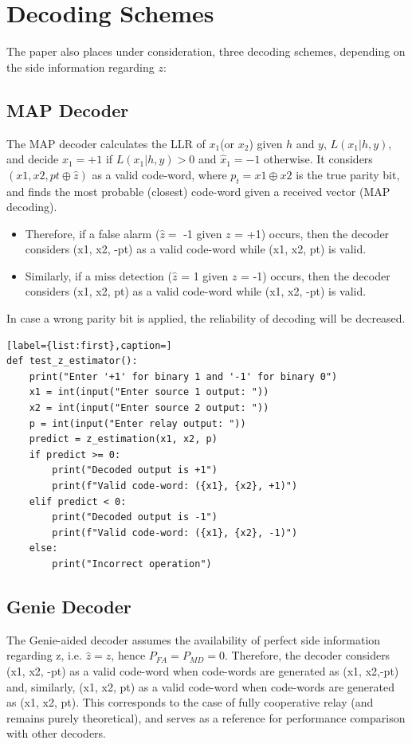 \documentclass[conference]{IEEEtran}
\begin{document}
\section{Decoding Schemes}
The paper also places under consideration, three decoding schemes, depending on the side information regarding $z$:
\subsection{MAP Decoder}
The MAP decoder calculates the LLR of $x_1$(or $x_2$) given $h$ and $y$, $L(x_1|h,y)$, and decide $\hat x_1= +1$ if $L(x_1|h,y)>0$ and $\hat x_1= -1$ otherwise. \newline
It considers $(x1, x2, pt \oplus \hat{z})$ as a valid code-word, where $p_t = x1\oplus x2$ is the true parity bit, and finds the most probable (closest) code-word given a received vector (MAP decoding). 
\begin{itemize}
\item Therefore, if a false alarm ($\hat{z}=$ -1 given $z$ = +1) occurs, then the decoder considers (x1, x2, -pt)  as a valid code-word while (x1, x2, pt) is valid. 
\item Similarly, if a miss detection ($\hat{z}$ = 1 given $z$ = -1) occurs, then the decoder considers (x1, x2, pt) as a valid code-word while (x1, x2, -pt) is valid. 
\end{itemize}
In case a wrong parity bit is applied, the reliability of decoding will be decreased.
\begin{lstlisting}[label={list:first},caption=]
def test_z_estimator():
    print("Enter '+1' for binary 1 and '-1' for binary 0")
    x1 = int(input("Enter source 1 output: "))
    x2 = int(input("Enter source 2 output: "))
    p = int(input("Enter relay output: "))
    predict = z_estimation(x1, x2, p)
    if predict >= 0:
        print("Decoded output is +1")
        print(f"Valid code-word: ({x1}, {x2}, +1)")
    elif predict < 0:
        print("Decoded output is -1")
        print(f"Valid code-word: ({x1}, {x2}, -1)")
    else:
        print("Incorrect operation")
\end{lstlisting}
\subsection{Genie Decoder}
The Genie-aided decoder assumes the availability of perfect side information regarding z, i.e. $\hat{z} = z$, hence $P_{FA}=P_{MD}=0$. Therefore, the decoder considers (x1, x2, -pt) as a valid code-word when code-words are generated as (x1, x2,-pt) and, similarly, (x1, x2, pt) as a valid code-word when code-words are generated as (x1, x2, pt). This corresponds to the case of fully cooperative relay (and remains purely theoretical), and serves as a reference for performance comparison with other decoders.
\end{document}
